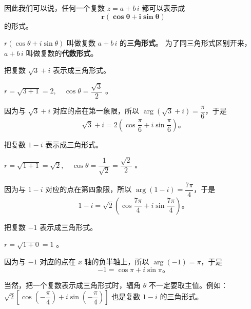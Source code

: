因此我们可以说，任何一个复数 $z = a + b\,i$ 都可以表示成
$$ \bm{r(\cos\theta + i\sin\theta)} $$
的形式。

$r(\cos\theta + i\sin\theta)$ 叫做复数 $a + b\,i$ 的\textbf{三角形式}。
为了同三角形式区别开来，$a + b\,i$ 叫做复数的\textbf{代数形式}。


\liti 把复数 $\sqrt{3} + i$ 表示成三角形式。

\jie \quad $r = \sqrt{3 + 1} = 2, \quad \cos\theta = \dfrac{\sqrt{3}}{2}$ 。

因为与 $\sqrt{3} + i$ 对应的点在第一象限，所以 $\arg(\sqrt{3} + i) = \dfrac{\pi}{6}$，于是
$$ \sqrt{3} + i = 2 \left( \cos\dfrac{\pi}{6} + i \sin\dfrac{\pi}{6} \right) \text{。} $$



\liti 把复数 $1 - i$ 表示成三角形式。

\jie \quad $r = \sqrt{1 + 1} = \sqrt{2}, \quad \cos\theta = \dfrac{1}{\sqrt{2}} = \dfrac{\sqrt{2}}{2}$ 。

因为与 $1 - i$ 对应的点在第四象限，所以 $\arg(1 - i) = \dfrac{7\pi}{4}$，于是
$$ 1 - i = \sqrt{2} \left( \cos\dfrac{7\pi}{4} + i\sin\dfrac{7\pi}{4} \right) \text{。} $$


\liti 把复数 $-1$ 表示成三角形式。

\jie \quad $r = \sqrt{1 + 0} = 1$ 。

因为与 $-1$ 对应的点在 $x$ 轴的负半轴上，所以 $\arg(-1) = \pi$，于是
$$ -1 = \cos\pi + i\sin\pi \text{。} $$

当然，把一个复数表示成三角形式时，辐角 $\theta$ 不一定要取主值。例如：
$\sqrt{2} \left[ \cos\left( -\dfrac{\pi}{4} \right) + i\sin\left( -\dfrac{\pi}{4} \right)\right]$
也是复数 $1 - i$ 的三角形式。



